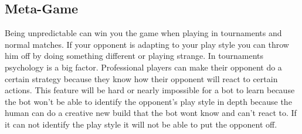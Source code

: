 \subsection{Meta-Game}		
		Being unpredictable can win you the game when playing in tournaments and normal matches. 
		If your opponent is adapting to your play style you can throw him off by doing something different or playing strange.
		In tournaments psychology is a big factor. Professional players can make their opponent do a certain strategy because they know 
		how their opponent will react to certain actions. This feature will be hard or nearly impossible for a bot to learn because the bot won't be able to 
		identify the opponent's play style in depth because the human can do a creative new build that the bot wont know and can't react to. 
		If it can not identify the play style it will not be able to put the opponent off. \\

